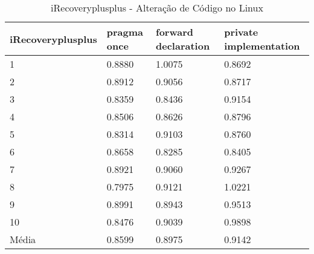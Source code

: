 \begin{table}[!h]
\centering
\caption{iRecoveryplusplus - Alteração de Código no Linux}
\label{tab:alteracao_de_codigo:linux:irecovery}
\begin{tabular}{llll}
\textbf{iRecoveryplusplus} & \textbf{pragma once} & \textbf{forward declaration} & \textbf{private implementation}   \\ \toprule
1                                    & 0.8880   & 1.0075   &  0.8692     \\ 
2                                    & 0.8912   & 0.9056   &  0.8717     \\ 
3                                    & 0.8359   & 0.8436   &  0.9154     \\ 
4                                    & 0.8506   & 0.8626   &  0.8796     \\ 
5                                    & 0.8314   & 0.9103   &  0.8760     \\ 
6                                    & 0.8658   & 0.8285   &  0.8405     \\ 
7                                    & 0.8921   & 0.9060   &  0.9267     \\ 
8                                    & 0.7975   & 0.9121   &  1.0221     \\ 
9                                    & 0.8991   & 0.8943   &  0.9513     \\ 
10                                   & 0.8476   & 0.9039   &  0.9898     \\ \bottomrule
Média                                & 0.8599   & 0.8975   &  0.9142     \\ 
\end{tabular}
\end{table}

